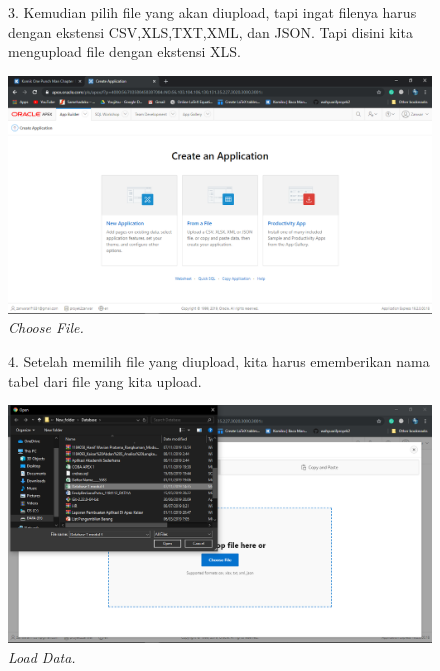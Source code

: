 \begin{enumerate}
    \begin{figure}[!htbp]
    \item[3.] Kemudian pilih file yang akan diupload, tapi ingat filenya harus dengan ekstensi CSV,XLS,TXT,XML, dan JSON. Tapi disini kita mengupload file dengan ekstensi XLS.
        \begin{center}
        \includegraphics[scale=0.3]{figures/Screenshot(118).png}
        \caption{\textit{Choose File.}}
        \end{center}   
    \end{figure}
    
    \begin{figure}[!htbp]
    \item[4.] Setelah memilih file yang diupload, kita harus ememberikan nama tabel dari file yang kita upload.
    \begin{center}
    \includegraphics[scale=0.3]{figures/Screenshot(119).png}
    \caption{\textit{Load Data.}}
    \end{center}   
    \end{figure}
    

\end{enumerate}

